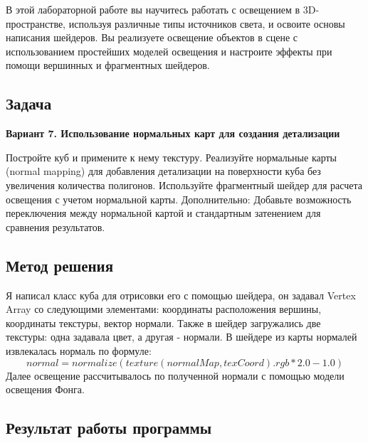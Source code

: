 \documentclass[12pt]{article}
\begin{document}
В этой лабораторной работе вы научитесь работать с освещением в 3D-пространстве,
используя различные типы источников света, и освоите основы написания шейдеров. Вы
реализуете освещение объектов в сцене с использованием простейших моделей
освещения и настроите эффекты при помощи вершинных и фрагментных шейдеров.

\subsection*{Задача}

\textbf{Вариант 7. Использование нормальных карт для создания детализации}

Постройте куб и примените к нему текстуру.
Реализуйте нормальные карты (normal mapping) для добавления детализации на
поверхности куба без увеличения количества полигонов.
Используйте фрагментный шейдер для расчета освещения с учетом нормальной карты.
Дополнительно: Добавьте возможность переключения между нормальной картой и
стандартным затенением для сравнения результатов.

\subsection*{Метод решения}

Я написал класс куба для отрисовки его с помощью шейдера, он задавал Vertex Array со следующими элементами:
координаты расположения вершины, координаты текстуры, вектор нормали. Также в шейдер загружались две текстуры:
одна задавала цвет, а другая - нормали. В шейдере из карты нормалей извлекалась нормаль по формуле: 
$$normal = normalize(texture(normalMap, texCoord).rgb * 2.0 - 1.0)$$
Далее освещение рассчитывалось по полученной нормали с помощью модели освещения Фонга.

\subsection*{Результат работы программы}
\end{document}
